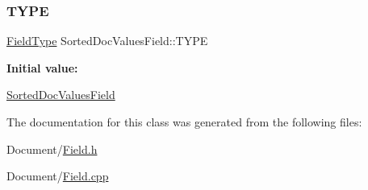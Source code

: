 \subsubsection{\texorpdfstring{T\+Y\+PE}{TYPE}}
{\footnotesize\ttfamily \mbox{\hyperlink{classlucene_1_1core_1_1document_1_1FieldType}{Field\+Type}} Sorted\+Doc\+Values\+Field\+::\+T\+Y\+PE\hspace{0.3cm}{\ttfamily [static]}}

{\bfseries Initial value\+:}
\begin{DoxyCode}
\DoxyCodeLine{= []() \{}
\DoxyCodeLine{\}()}
\end{DoxyCode}
\mbox{\hyperlink{classlucene_1_1core_1_1document_1_1SortedDocValuesField}{Sorted\+Doc\+Values\+Field}} 

The documentation for this class was generated from the following files\+:\begin{DoxyCompactItemize}
\item 
Document/\mbox{\hyperlink{Document_2Field_8h}{Field.\+h}}\item 
Document/\mbox{\hyperlink{Field_8cpp}{Field.\+cpp}}\end{DoxyCompactItemize}
